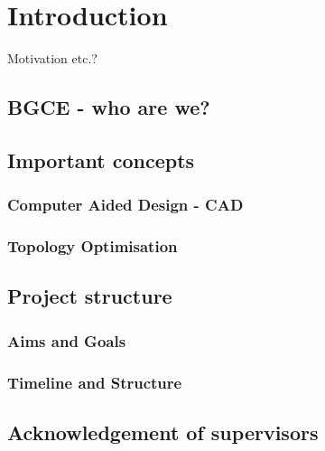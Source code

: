 \chapter{Introduction}
\label{chapter:Introduction}


Motivation etc.? 
 
\section{BGCE - who are we?}

\section{Important concepts}

\subsection{Computer Aided Design - CAD}

\subsection{Topology Optimisation}

\section{Project structure}
\subsection{Aims and Goals}
\subsection{Timeline and Structure}

\section{Acknowledgement of supervisors}



